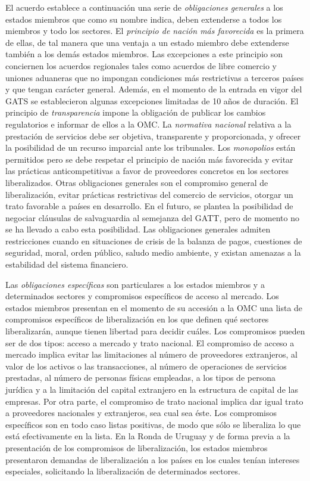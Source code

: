 \documentclass{nuevotema}
\begin{document}
El acuerdo establece a continuación una serie de \textit{obligaciones generales} a los estados miembros que como su nombre indica, deben extenderse a todos los miembros y todo los sectores. El \textit{principio de nación más favorecida} es la primera de ellas, de tal manera que una ventaja a un estado miembro debe extenderse también a los demás estados miembros. Las excepciones a este principio son conciernen los acuerdos regionales tales como acuerdos de libre comercio y uniones aduaneras que no impongan condiciones más restrictivas a terceros países y que tengan carácter general. Además, en el momento de la entrada en vigor del GATS se establecieron algunas excepciones limitadas de 10 años de duración. El principio de \textit{transparencia} impone la obligación de publicar los cambios regulatorios e informar de ellos a la OMC. La \textit{normativa nacional} relativa a la prestación de servicios debe ser objetiva, transparente y proporcionada, y ofrecer la posibilidad de un recurso imparcial ante los tribunales. Los \textit{monopolios} están permitidos pero se debe respetar el principio de nación más favorecida y evitar las prácticas anticompetitivas a favor de proveedores concretos en los sectores liberalizados. Otras obligaciones generales son el compromiso general de liberalización, evitar prácticas restrictivas del comercio de servicios, otorgar un trato favorable a países en desarrollo. En el futuro, se plantea la posibilidad de negociar cláusulas de salvaguardia al semejanza del GATT, pero de momento no se ha llevado a cabo esta posibilidad. Las obligaciones generales admiten restricciones cuando en situaciones de crisis de la balanza de pagos, cuestiones de seguridad, moral, orden público, saludo medio ambiente, y existan amenazas a la estabilidad del sistema financiero.

Las \textit{obligaciones específicas} son particulares a los estados miembros y a determinados sectores y compromisos específicos de acceso al mercado. Los estados miembros presentan en el momento de su accesión a la OMC una lista de compromisos específicos de liberalización en los que definen qué sectores liberalizarán, aunque tienen libertad para decidir cuáles. Los compromisos pueden ser de dos tipos: acceso a mercado y trato nacional. El compromiso de acceso a mercado implica evitar las limitaciones al número de proveedores extranjeros, al valor de los activos o las transacciones, al número de operaciones de servicios prestadas, al número de personas físicas empleadas, a los tipos de persona jurídica y a la limitación del capital extranjero en la estructura de capital de las empresas. Por otra parte, el compromiso de trato nacional implica dar igual trato a proveedores nacionales y extranjeros, sea cual sea éste. Los compromisos específicos son en todo caso listas positivas, de modo que sólo se liberaliza lo que está efectivamente en la lista. En la Ronda de Uruguay y de forma previa a la presentación de los compromisos de liberalización, los estados miembros presentaron demandas de liberalización a los países en los cuales tenían intereses especiales, solicitando la liberalización de determinados sectores.
\end{document}
